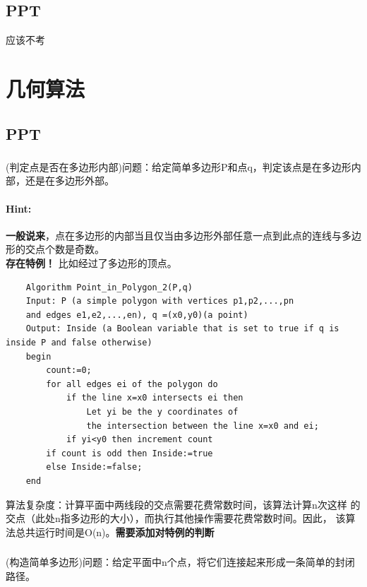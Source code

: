 \documentclass{article}
\begin{document}
     \subsection{PPT}
     应该不考
     
     \section{几何算法}
     \subsection{PPT}
     
     \subsubsection{}(判定点是否在多边形内部)问题：给定简单多边形P和点q，判定该点是在多边形内部，还是在多边形外部。

     \paragraph{Hint:}\textbf{一般说来}，点在多边形的内部当且仅当由多边形外部任意一点到此点的连线与多边形的交点个数是奇数。\\
     \textbf{存在特例！} 比如经过了多边形的顶点。
       \lstset{language=C}
    \begin{lstlisting}
    Algorithm Point_in_Polygon_2(P,q)
    Input: P (a simple polygon with vertices p1,p2,...,pn
    and edges e1,e2,...,en), q =(x0,y0)(a point)
    Output: Inside (a Boolean variable that is set to true if q is inside P and false otherwise)
    begin
        count:=0;
        for all edges ei of the polygon do
            if the line x=x0 intersects ei then
                Let yi be the y coordinates of 
                the intersection between the line x=x0 and ei;
            if yi<y0 then increment count
        if count is odd then Inside:=true
        else Inside:=false;
    end

    \end{lstlisting}
    
算法复杂度：计算平面中两线段的交点需要花费常数时间，该算法计算n次这样
的交点（此处n指多边形的大小），而执行其他操作需要花费常数时间。因此，
该算法总共运行时间是O(n)。\textbf{需要添加对特例的判断}
    
     \subsubsection{}(构造简单多边形)问题：给定平面中n个点，将它们连接起来形成一条简单的封闭路径。
\end{document}
